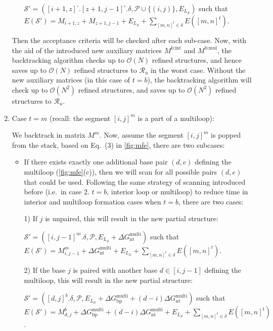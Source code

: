 \begin{enumerate}
\begin{itemize}
		$\mathcal{S}' = ([i+1,z]^\square.[z+1,j-1]^\square.\delta, \mathcal{P} \cup \{(i,j)\}, E_{L_{\mathcal{S}}})$ such that $E(\mathcal{S}') = M_{i+1,z} +  M_{z+1,j-1} +  E_{L_{\mathcal{S}}} + \sum \limits_{[m,n]^t \in \delta} E([m,n]^t)$.   
		
		
		
	\end{itemize}
	
	Then the acceptance criteria will be checked after each sub-case. Now, with the aid of the introduced new auxiliary matrices $M^\text{b:int}$ and $M^\text{b:mul}$, the backtracking algorithm checks up to $\mathcal{O}(N)$ refined structures, and hence saves up to  $\mathcal{O}(N)$ refined structures to $\mathcal{R}_u$ in the worst case. Without the  new auxiliary matrices (in this case of $t=b$), the backtracking algorithm will check up to $\mathcal{O}(N^2)$ refined structures, and saves up to  $\mathcal{O}(N^2)$ refined structures to $\mathcal{R}_u$.
	
	
	\item
	Case $t = m$ 	(recall: the segment $[i,j]^m$ is a part of a multiloop): 
	
	We backtrack in matrix $M^m$. 
	Now, assume the segment $[i,j]^m$ is popped from the stack, based on Eq.~(3) in \cref{fig:mfe},  there are two subcases:
	
	\begin{itemize}
		\item  If there exists exactly one additional base pair $(d,e)$ defining the multiloop (\cref{fig:mfe}(c)), then we will scan for all possible pairs $(d,e)$ that could be used. Following the same strategy of scanning introduced before (i.e.~in case 2. $t=b$, interior loop or multiloop) to reduce time in interior and multiloop formation cases when $t = b$, there are two cases: 
		
		1) If $j$ is unpaired, this will
		result in the new partial structure: 
		
		$\mathcal{S}' = ([i,j-1]^m.\delta, \mathcal{P}, E_{L_{\mathcal{S}}} + \Delta G_\text{nt}^\text{multi})$ such that $E(\mathcal{S}') = M_{i,j-1}^m + \Delta G_\text{nt}^\text{multi} +E_{L_{\mathcal{S}}} + \sum \limits_{[m,n]^t \in \delta} E([m,n]^t)$. 	 	
		
		2) If the base $j$ is paired with another base $d \in [i,j-1]$ defining the multiloop, this will result in the new partial structure: 
		
		$\mathcal{S}' = ([d,j]^b.\delta, \mathcal{P}, E_{L_{\mathcal{S}}} + \Delta G_\text{bp}^\text{multi} + (d-i) \Delta G_\text{nt}^\text{multi})$ such that $E(\mathcal{S}') = M^b_{d,j} + \Delta G_\text{bp}^\text{multi}+ (d-i) \Delta G_\text{nt}^\text{multi} +E_{L_{\mathcal{S}}} 
		+ \sum \limits_{[m,n]^t \in \delta} E([m,n]^t)$. 
		

\end{itemize}
\end{enumerate}

